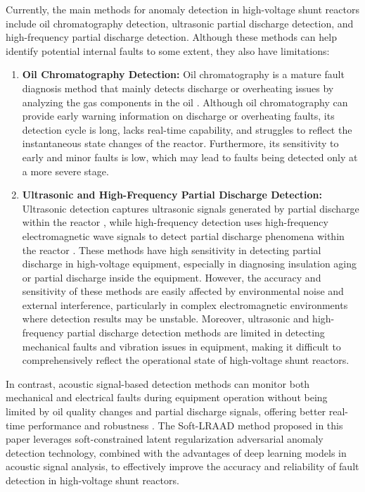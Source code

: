\documentclass{article}
\begin{document}
Currently, the main methods for anomaly detection in high-voltage shunt reactors include oil chromatography detection, ultrasonic partial discharge detection, and high-frequency partial discharge detection. Although these methods can help identify potential internal faults to some extent, they also have limitations:

\begin{enumerate}

  \item{\textbf{Oil Chromatography Detection:} Oil chromatography is a mature fault diagnosis method that mainly detects discharge or overheating issues by analyzing the gas components in the oil \cite{ali2023conventional}. Although oil chromatography can provide early warning information on discharge or overheating faults, its detection cycle is long, lacks real-time capability, and struggles to reflect the instantaneous state changes of the reactor. Furthermore, its sensitivity to early and minor faults is low, which may lead to faults being detected only at a more severe stage.}

  \item{\textbf{Ultrasonic and High-Frequency Partial Discharge Detection:} Ultrasonic detection captures ultrasonic signals generated by partial discharge within the reactor \cite{wang2018partial}, while high-frequency detection uses high-frequency electromagnetic wave signals to detect partial discharge phenomena within the reactor \cite{zheng2020feasibility}. These methods have high sensitivity in detecting partial discharge in high-voltage equipment, especially in diagnosing insulation aging or partial discharge inside the equipment. However, the accuracy and sensitivity of these methods are easily affected by environmental noise and external interference, particularly in complex electromagnetic environments where detection results may be unstable. Moreover, ultrasonic and high-frequency partial discharge detection methods are limited in detecting mechanical faults and vibration issues in equipment, making it difficult to comprehensively reflect the operational state of high-voltage shunt reactors.}

\end{enumerate}

In contrast, acoustic signal-based detection methods can monitor both mechanical and electrical faults during equipment operation without being limited by oil quality changes and partial discharge signals, offering better real-time performance and robustness \cite{ilkhechi2021applications, gao2022early}. The Soft-LRAAD method proposed in this paper leverages soft-constrained latent regularization adversarial anomaly detection technology, combined with the advantages of deep learning models in acoustic signal analysis, to effectively improve the accuracy and reliability of fault detection in high-voltage shunt reactors.
\end{document}
